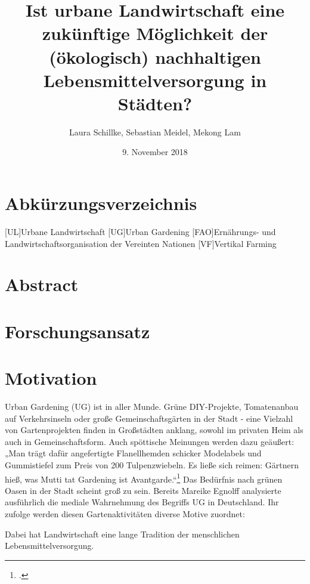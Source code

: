 \documentclass{scrartcl}
\title{Ist urbane Landwirtschaft eine zukünftige Möglichkeit der (ökologisch) nachhaltigen Lebensmittelversorgung in Städten?}
\author{Laura Schillke, Sebastian Meidel, Mekong Lam }
\date{9. November 2018}
\begin{document}
\maketitle


\newpage

\setcounter{tocdepth}{3}
\tableofcontents 



\newpage
\section{Abkürzungsverzeichnis}

\begin{acronym}
	[UL]{Urbane Landwirtschaft}
	[UG]{Urban Gardening}
	[FAO]{Ernährungs- und Landwirtschaftsorganisation der Vereinten Nationen} 
	[VF]{Vertikal Farming}
\end{acronym}


\newpage

\section{Abstract}

\section{Forschungsansatz}

\section{Motivation}

Urban Gardening (UG) ist in aller Munde. Grüne DIY-Projekte, Tomatenanbau auf Verkehrsinseln oder große Gemeinschaftsgärten in der Stadt - eine Vielzahl von Gartenprojekten finden in Großstädten anklang, sowohl im privaten Heim als auch in Gemeinschaftsform. Auch spöttische Meinungen werden dazu geäußert: „Man trägt dafür angefertigte Flanellhemden schicker Modelabels und Gummistiefel zum Preis von 200 Tulpenzwiebeln. Es ließe sich reimen: Gärtnern hieß, was Mutti tat Gardening ist Avantgarde.“\footcite{HugendeckZeit}
Das Bedürfnis nach grünen Oasen in der Stadt scheint groß zu sein. 
Bereits Mareike Egnolff analysierte ausführlich die mediale Wahrnehmung des Begriffs UG in Deutschland. Ihr zufolge werden diesen Gartenaktivitäten diverse Motive zuordnet: 

Dabei hat Landwirtschaft eine lange Tradition der menschlichen Lebensmittelversorgung.
\end{document}
